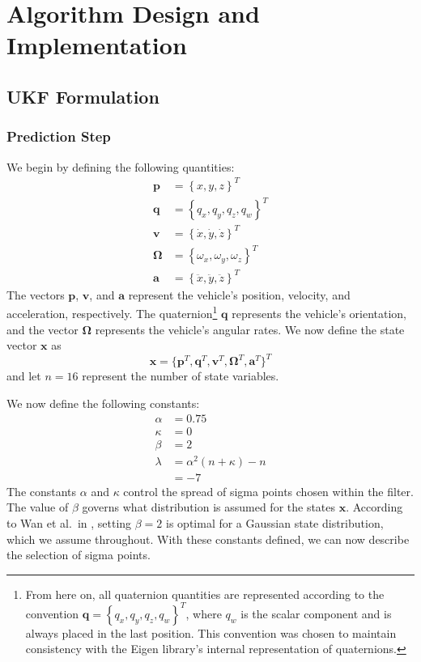 \chapter{Algorithm Design and Implementation} \label{ch:Alg_Design}

\section{UKF Formulation} \label{sec:ukf_formulation}

\subsection{Prediction Step}

We begin by defining the following quantities:
%
\begin{align} \label{eq:state_vars}
\mathbf{p} &= \left\lbrace x, y, z \right\rbrace ^{T} \\
\mathbf{q} &= \left\lbrace q_{x}, q_{y}, q_{z}, q_{w} \right\rbrace ^{T} \\
\mathbf{v} &= \left\lbrace \dot{x}, \dot{y}, \dot{z} \right\rbrace ^{T} \\
\bm{\Omega} &= \left\lbrace \omega_{x}, \omega_{y}, \omega_{z} \right\rbrace ^{T} \\
\mathbf{a} &= \left\lbrace \ddot{x}, \ddot{y}, \ddot{z} \right\rbrace ^{T}
\end{align}
%
The vectors $\mathbf{p}$, $\mathbf{v}$, and $\mathbf{a}$ represent the vehicle's position, velocity, and acceleration, respectively. The quaternion\footnote{From here on, all quaternion quantities are represented according to the convention $\mathbf{q} = \left\lbrace q_{x}, q_{y}, q_{z}, q_{w} \right\rbrace ^{T}$, where $q_{w}$ is the scalar component and is always placed in the last position. This convention was chosen to maintain consistency with the Eigen library's internal representation of quaternions.} $\mathbf{q}$ represents the vehicle's orientation, and the vector $\bm{\Omega}$ represents the vehicle's angular rates. We now define the state vector $\mathbf{x}$ as
%
\begin{equation}
\mathbf{x} = 
\Big\{
    \mathbf{p}^{T},
    \mathbf{q}^{T},
    \mathbf{v}^{T},
    \bm{\Omega}^{T},
    \mathbf{a}^{T}
\Big\} ^{T}
\end{equation}
%
and let $n = 16$ represent the number of state variables.

We now define the following constants:
%
\begin{align}
\alpha &= 0.75 \nonumber \\
\kappa &= 0 \nonumber \\
\beta &= 2 \\
\lambda &= \alpha^{2} \left( n + \kappa \right) - n \nonumber \\
&= -7 \nonumber
\end{align}
%
The constants $\alpha$ and $\kappa$ control the spread of sigma points chosen within the filter. The value of $\beta$ governs what distribution is assumed for the states $\mathbf{x}$. According to Wan et al.\ in \cite{Wan2000}, setting $\beta = 2$ is optimal for a Gaussian state distribution, which we assume throughout. With these constants defined, we can now describe the selection of sigma points.

